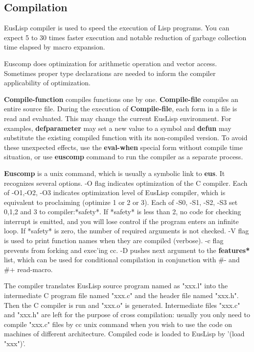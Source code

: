 \newpage

\subsection{Compilation}\label{compiler}

EusLisp compiler is used to speed the execution of Lisp programs.
You can expect 5 to 30 times faster execution and notable reduction of garbage
collection time elapsed by macro expansion.

Euscomp does optimization for arithmetic operation and vector access.
Sometimes proper type declarations are needed to inform
the compiler applicability of optimization.

{\bf Compile-function} compiles functions one by one.
{\bf Compile-file}  compiles an entire source file.
During the execution of {\bf Compile-file}, each form in a file
is read and evaluated.
This may change the current EusLisp environment.
For examples, {\bf defparameter}
may set a new value to a symbol and {\bf defun} may substitute the existing
compiled function with its non-compiled version.
To avoid these unexpected effects, use the {\bf eval-when} special form
without compile time situation,
or use {\bf euscomp} command to run the compiler as a separate process.

{\bf Euscomp} is a unix command, which is usually a symbolic link to {\bf eus}.
It recognizes several options.
-O flag indicates optimization of the C compiler.
Each of -O1,-O2, -O3 indicates optimization level of EusLisp compiler,
which is equivalent to proclaiming (optimize 1 or 2 or 3).
Each of -S0, -S1, -S2, -S3 set 0,1,2 and 3 to compiler:*safety*.
If *safety* is less than 2, no code for checking interrupt is emitted,
and you will lose control if the program enters an infinite loop.
If *safety* is zero, the number of required arguments is not checked.
-V flag is used to print function names when they are compiled (verbose).
-c flag prevents from forking and exec'ing cc.
-D pushes next argument to the {\bf *features*} list, which can be used for
conditional compilation in conjunction with \#- and \#+ read-macro.

The compiler translates EusLisp source program named as "xxx.l" 
into the intermediate C program file named "xxx.c" and the  header file
named "xxx.h".
Then the C compiler is run and "xxx.o" is generated.
Intermediate files "xxx.c" and "xxx.h" are left
for the purpose of cross compilation:
usually you only need to compile "xxx.c" files by cc unix command
when you wish to use the code on machines of different architecture.
Compiled code is loaded to EusLisp by '(load "xxx")'.

